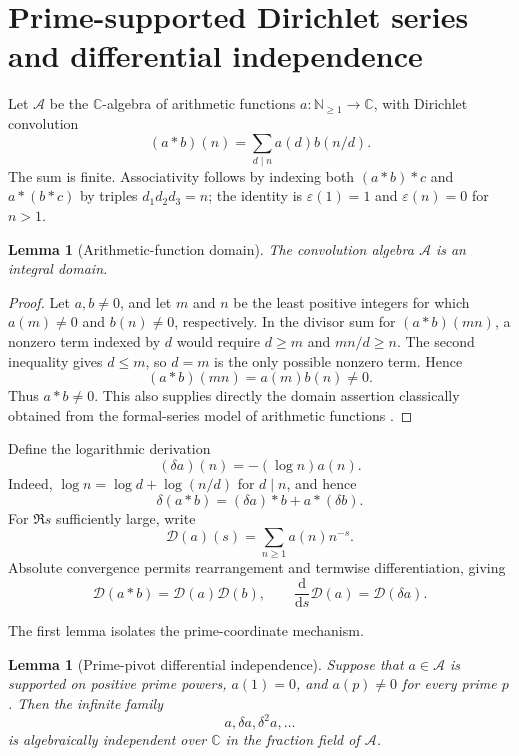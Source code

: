 \documentclass[11pt]{article}
\numberwithin{equation}{section}
\newtheorem{lemma}[theorem]{Lemma}
\theoremstyle{definition}
\theoremstyle{remark}
\newcommand{\C}{\mathbb C}
\newcommand{\N}{\mathbb N}
\newcommand{\A}{\mathcal A}
\newcommand{\D}{\mathcal D}
\newcommand{\dd}{\mathrm d}
\begin{document}
\section{Prime-supported Dirichlet series and differential independence}
\label{sec:dirichlet}

Let $\A$ be the $\C$-algebra of arithmetic functions $a:\N_{\geq1}\to\C$, with Dirichlet
convolution
\[
 (a*b)(n)=\sum_{d\mid n}a(d)b(n/d).
\]
The sum is finite.  Associativity follows by indexing both $(a*b)*c$ and $a*(b*c)$ by triples
$d_1d_2d_3=n$; the identity is $\varepsilon(1)=1$ and $\varepsilon(n)=0$ for $n>1$.

\begin{lemma}[Arithmetic-function domain]
\label{lem:arithmetic-domain}
The convolution algebra $\A$ is an integral domain.
\end{lemma}

\begin{proof}
Let $a,b\neq0$, and let $m$ and $n$ be the least positive integers for which $a(m)\neq0$ and
$b(n)\neq0$, respectively.  In the divisor sum for $(a*b)(mn)$, a nonzero term indexed by $d$
would require $d\geq m$ and $mn/d\geq n$.  The second inequality gives $d\leq m$, so $d=m$ is
the only possible nonzero term.  Hence
\[
 (a*b)(mn)=a(m)b(n)\neq0.
\]
Thus $a*b\neq0$.  This also supplies directly the domain assertion classically obtained from the
formal-series model of arithmetic functions \cite{CashwellEverett1959}.
\end{proof}

Define the logarithmic derivation
\begin{equation}
 (\delta a)(n)=-(\log n)a(n).
 \label{eq:log-derivation}
\end{equation}
Indeed, $\log n=\log d+\log(n/d)$ for $d\mid n$, and hence
\[
 \delta(a*b)=(\delta a)*b+a*(\delta b).
\]
For $\Re s$ sufficiently large, write
\[
 \D(a)(s)=\sum_{n\geq1}a(n)n^{-s}.
\]
Absolute convergence permits rearrangement and termwise differentiation, giving
\begin{equation}
 \D(a*b)=\D(a)\D(b),
 \qquad
 \frac{\dd}{\dd s}\D(a)=\D(\delta a).
 \label{eq:dirichlet-hom}
\end{equation}

The first lemma isolates the prime-coordinate mechanism.

\begin{lemma}[Prime-pivot differential independence]
\label{lem:prime-pivot}
Suppose that $a\in\A$ is supported on positive prime powers, $a(1)=0$, and $a(p)\neq0$ for every
prime $p$.  Then the infinite family
\[
 a,\delta a,\delta^2a,\ldots
\]
is algebraically independent over $\C$ in the fraction field of $\A$.
\end{lemma}
\end{document}
